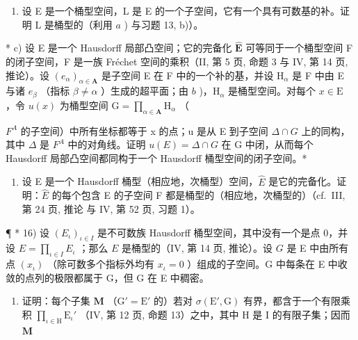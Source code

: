 \begin{enumerate}
\def\labelenumi{\alph{enumi})}
\setcounter{enumi}{1}
\tightlist
\item
  设 E 是一个桶型空间，L 是 E 的一个子空间，它有一个具有可数基的补。证明 L 是桶型的（利用 \(a\) ) 与习题 13, b)）。
\end{enumerate}

* c) 设 E 是一个 Hausdorff 局部凸空间；它的完备化 \(\hat{\mathbf{E}}\) 可等同于一个桶型空间 F 的闭子空间，F 是一族 Fréchet 空间的乘积（II, 第 5 页, 命题 3 与 IV, 第 14 页, 推论）。设 \((e_{\alpha})_{\alpha \in \mathbf{A}}\) 是子空间 E 在 F 中的一个补的基，并设 \(\mathrm{H}_{\alpha}\) 是 F 中由 E 与诸 \(e_{\beta}\) （指标 \(\beta \neq \alpha\) ）生成的超平面；由 \(b\) )，\(\mathrm{H}_{\alpha}\) 是桶型空间。对每个 \(x \in \mathrm{E}\) ，令 \(u(x)\) 为桶型空间 \(\mathrm{G} = \prod_{\alpha \in \mathbf{A}} \mathrm{H}_{\alpha}\) （

\(F^{A}\) 的子空间）中所有坐标都等于 x 的点；u 是从 E 到子空间 \(\Delta \cap G\) 上的同构，其中 \(\Delta\) 是 \(F^{A}\) 中的对角线。证明 \(u(E) = \Delta \cap G\) 在 G 中闭，从而每个 Hausdorff 局部凸空间都同构于一个 Hausdorff 桶型空间的闭子空间。*

\begin{enumerate}
\def\labelenumi{\arabic{enumi})}
\setcounter{enumi}{14}
\tightlist
\item
  设 E 是一个 Hausdorff 桶型（相应地，次桶型）空间，\(\hat{E}\) 是它的完备化。证明：\(\hat{E}\) 的每个包含 E 的子空间 F 都是桶型的（相应地，次桶型的）（cf.~III, 第 24 页, 推论 与 IV, 第 52 页, 习题 1）。
\end{enumerate}

¶ * 16) 设 \((E_{\iota})_{\iota\in I}\) 是不可数族 Hausdorff 桶型空间，其中没有一个是点 0，并设 \(E = \prod_{\iota \in I} E_{\iota}\) ；那么 \(E\) 是桶型的（IV, 第 14 页, 推论）。设 \(G\) 是 E 中由所有点 \((x_{\iota})\) （除可数多个指标外均有 \(x_{\iota}=0\) ）组成的子空间。G 中每条在 E 中收敛的点列的极限都属于 G，但 G 在 E 中稠密。

\begin{enumerate}
\def\labelenumi{\alph{enumi})}
\tightlist
\item
  证明：每个子集 \(\mathbf{M}\) （\(\mathrm{G}' = \mathrm{E}'\) 的）若对 \(\sigma(\mathrm{E}', \mathrm{G})\) 有界，都含于一个有限乘积 \(\prod_{\iota \in \mathrm{H}} \mathrm{E}_{\iota}'\) （IV, 第 12 页, 命题 13）之中，其中 \(\mathrm{H}\) 是 I 的有限子集；因而 \(\mathbf{M}\)
\end{enumerate}

